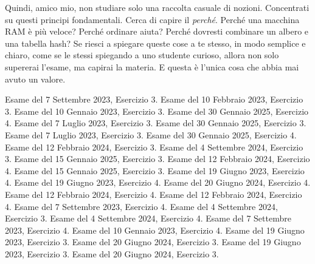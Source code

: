 \documentclass[a4paper, 11pt]{article}
\begin{document}
Quindi, amico mio, non studiare solo una raccolta casuale di nozioni. Concentrati su questi principi fondamentali. Cerca di capire il \textit{perché}. Perché una macchina RAM è più veloce? Perché ordinare aiuta? Perché dovresti combinare un albero e una tabella hash? Se riesci a spiegare queste cose a te stesso, in modo semplice e chiaro, come se le stessi spiegando a uno studente curioso, allora non solo supererai l'esame, ma capirai la materia. E questa è l'unica cosa che abbia mai avuto un valore.

\begin{thebibliography}{99}
     Esame del 7 Settembre 2023, Esercizio 3.
     Esame del 10 Febbraio 2023, Esercizio 3.
     Esame del 10 Gennaio 2023, Esercizio 3.
     Esame del 30 Gennaio 2025, Esercizio 4.
     Esame del 7 Luglio 2023, Esercizio 3.
     Esame del 30 Gennaio 2025, Esercizio 3.
     Esame del 7 Luglio 2023, Esercizio 3.
     Esame del 30 Gennaio 2025, Esercizio 4.
     Esame del 12 Febbraio 2024, Esercizio 3.
     Esame del 4 Settembre 2024, Esercizio 3.
     Esame del 15 Gennaio 2025, Esercizio 3.
     Esame del 12 Febbraio 2024, Esercizio 4.
     Esame del 15 Gennaio 2025, Esercizio 3.
     Esame del 19 Giugno 2023, Esercizio 4.
     Esame del 19 Giugno 2023, Esercizio 4.
     Esame del 20 Giugno 2024, Esercizio 4.
     Esame del 12 Febbraio 2024, Esercizio 4.
     Esame del 12 Febbraio 2024, Esercizio 4.
     Esame del 7 Settembre 2023, Esercizio 4.
     Esame del 4 Settembre 2024, Esercizio 3.
     Esame del 4 Settembre 2024, Esercizio 4.
     Esame del 7 Settembre 2023, Esercizio 4.
     Esame del 10 Gennaio 2023, Esercizio 4.
     Esame del 19 Giugno 2023, Esercizio 3.
     Esame del 20 Giugno 2024, Esercizio 3.
     Esame del 19 Giugno 2023, Esercizio 3.
     Esame del 20 Giugno 2024, Esercizio 3.
\end{thebibliography}
\end{document}
